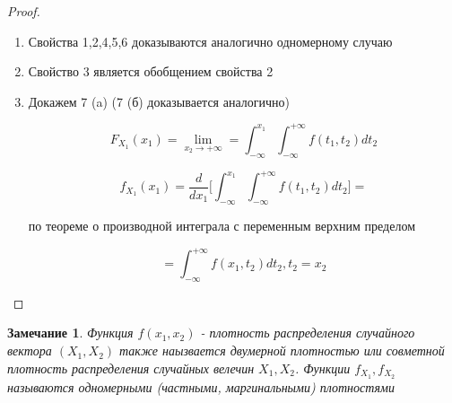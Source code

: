 \documentclass[a4paper, 14pt]{report}
\newtheorem{note}{Замечание}[section]
\begin{document}
\begin{proof}
    \begin{enumerate}
        \item Свойства 1,2,4,5,6 доказываются аналогично одномерному случаю
        \item Свойство 3 является обобщением свойства 2
        \item Докажем 7 (a) (7 (б) доказывается аналогично)

            $$
            F_{X_1}(x_1) = \lim_{x_2 \to +\infty} = \int_{-\infty}^{x_1}\int_{-\infty}^{+\infty} f(t_1, t_2) dt_2
            $$

            $$
            f_{X_1}(x_1) = \frac{d}{dx_1} \bigg[ \int_{-\infty}^{x_1}\int_{-\infty}^{+\infty} f(t_1, t_2) dt_2 \bigg] =
            $$


            по теореме о производной интеграла с переменным верхним пределом

            $$
            = \int_{-\infty}^{+\infty} f(x_1, t_2) dt_2, t_2 = x_2
            $$
    \end{enumerate}
\end{proof}

\begin{note}
    Функция $f(x_1, x_2)$ - плотность распределения случайного вектора $(X_1,X_2)$ также наызвается двумерной плотностью или совметной плотность распределения случайных велечин $X_1, X_2$. Функции $f_{X_1}, f_{X_2}$ называются одномерными (частными, маргинальными) плотностями
\end{note}
\end{document}
